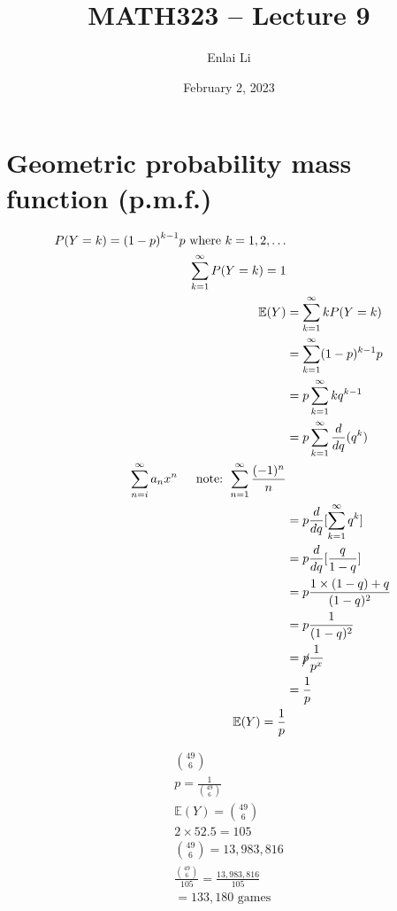 \documentclass{article}
\author{Enlai Li}
\title{MATH323 -- Lecture 9}
\date{February 2, 2023}
\begin{document}
\maketitle
\section{Geometric probability mass function (p.m.f.)}
\begin{align*}
    P(Y=k) = {(1-p)}^{k-1}p          \text{ where } k = 1, 2, \dots                         \\
    \sum_{k=1}^{\infty} P(Y=k) = 1                                                          \\
    \mathbb{E}(Y) & = \sum_{k=1}^{\infty} kP(Y=k)                                           \\
                  & = \sum_{k=1}^{\infty} (1-p)^{k-1}p                                      \\
                  & = p \sum_{k=1}^{\infty} kq^{k-1}                                        \\
                  & = p \sum_{k=1}^{\infty} \frac{d}{dq}(q^k)                               \\
    \sum_{n=i}^{\infty}a_nx ^{n} \text{\indent note: } \sum_{n=1}^{\infty} \frac{(-1)^n}{n} \\
                  & = p \frac{d}{dq}[\sum_{k=1}^{\infty} q^k]                               \\
                  & = p \frac{d}{dq}[\frac{q}{1-q}]                                         \\
                  & = p \frac{1 \times (1-q) + q}{(1-q)^2}                                  \\
                  & = p \frac{1 }{(1-q)^2}                                                  \\
                  & = \cancel{p} \frac{1}{p^x}                                              \\
                  & = \frac{1}{p}                                                           \\
    \mathbb{E}(Y) = \frac{1}{p}
\end{align*}

\begin{align*}
    \binom{49}{6}                                      \\
    p = \frac{1}{\binom{49}{6}}                        \\
    \mathbb{E}(Y) = \binom{49}{6}                      \\
    2 \times 52.5 = 105                                \\
    \binom{49}{6} = 13,983,816                         \\
    \frac{\binom{49}{6}}{105} = \frac{13,983,816}{105} \\
    = 133,180 \text{ games}
\end{align*}
\end{document}
